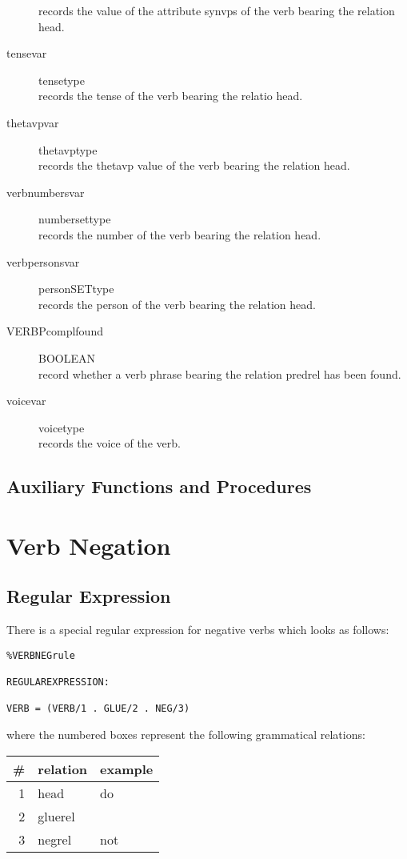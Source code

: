 \begin{description}
records the value of the attribute synvps of the verb bearing the relation head.
\item [tensevar           ] tensetype\\
records the tense of the verb bearing the relatio head.
\item [thetavpvar         ] thetavptype\\
records the thetavp value of the verb bearing the relation head.
\item [verbnumbersvar     ] numbersettype\\
records the number of the verb bearing the relation head.
\item [verbpersonsvar     ] personSETtype\\
records the person of the verb bearing the relation head.
\item [VERBPcomplfound    ] BOOLEAN\\
record whether a verb phrase bearing the relation predrel has been found.
\item [voicevar           ] voicetype\\
records the voice of the verb.
\end{description}
\subsection{Auxiliary Functions and Procedures}
\section{Verb Negation}
\subsection{Regular Expression}
There is a special regular expression for negative verbs which looks as 
follows:\\
\begin{verbatim}
%VERBNEGrule

REGULAREXPRESSION:

VERB = (VERB/1 . GLUE/2 . NEG/3)   
\end{verbatim}
where the numbered boxes represent the following grammatical relations:\\
\newline
\begin{tabular}{|r|l|l|} \hline
\#&relation&example\\ \hline
1&head&do\\ \hline
2&gluerel&\\ \hline
3&negrel&not\\ \hline
\end{tabular}
